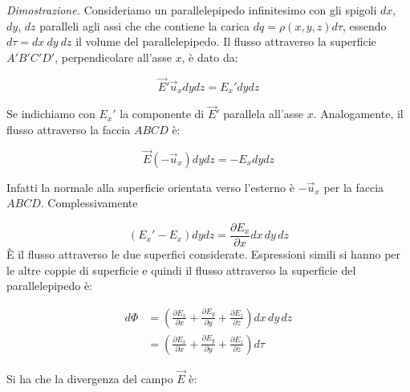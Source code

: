 \begin{figure}[htpb]
\end{figure}
\FloatBarrier

\emph{Dimostrazione.} Consideriamo un parallelepipedo infinitesimo con gli spigoli $dx$, $dy$, $dz$ paralleli agli assi che che contiene la carica $dq=\rho(x,y,z) d\tau $, essendo $d\tau = dx\ dy\ dz$ il volume del parallelepipedo. Il flusso attraverso la superficie $A' B' C' D'$, perpendicolare all'asse $x$, è dato da:

\[
	\vec{E}' \vec{u}_x dydz = E_x'dydz
\]

Se indichiamo con $E_x'$ la componente di $\vec{E}'$ parallela all'asse $x$. Analogamente, il flusso attraverso la faccia $ABCD$ è:

\[
	\vec{E} (-\vec{u}_x)dydz = -E_x dydz
\]

Infatti la normale alla superficie orientata verso l'esterno è $-\vec{u}_x$ per la faccia $ABCD$. Complessivamente

\[
	(E_x'-E_x)dydz = \frac{\partial E_x}{\partial x} dx\,dy\,dz
\]
È il flusso attraverso le due superfici considerate. Espressioni simili si hanno per le altre coppie di superficie e quindi il flusso attraverso la superficie del parallelepipedo è:

\begin{align*}
	d\Phi &= \left( \frac{\partial E_x}{\partial x} +\frac{\partial E_y}{\partial y} + \frac{\partial E_z}{\partial z}  \right) dx\,dy\,dz \\
	&= \left( \frac{\partial E_x}{\partial x} +\frac{\partial E_y}{\partial y} + \frac{\partial E_z}{\partial z}  \right) d\tau
\end{align*}

Si ha che la divergenza del campo $\vec{E}$ è:

